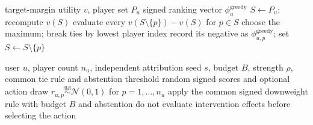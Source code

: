 \documentclass[pdflatex,sn-mathphys-num]{sn-jnl}
\theoremstyle{thmstyleone}
\theoremstyle{thmstyletwo}
\theoremstyle{thmstylethree}
\begin{document}
\begin{algorithm}[t]
\caption{Greedy sequential-deletion baseline}
\label{alg:greedy-baseline}
\begin{algorithmic}[1]
\Require target-margin utility $v$, player set $P_u$
\Ensure signed ranking vector $\phi^{\mathrm{greedy}}_u$
\State $S\gets P_u$; recompute $v(S)$
  \State evaluate every $v(S\setminus\{p\})-v(S)$ for $p\in S$
  \State choose the maximum; break ties by lowest player index
  \State record its negative as $\phi^{\mathrm{greedy}}_{u,p}$; set $S\gets S\setminus\{p\}$
\EndWhile
\end{algorithmic}
\end{algorithm}

\begin{algorithm}[t]
\caption{Random attribution negative control}
\label{alg:random-baseline}
\begin{algorithmic}[1]
\Require user $u$, player count $n_u$, independent attribution seed $s$, budget $B$, strength $\rho$, common tie rule and abstention threshold
\Ensure random signed scores and optional action
\State draw $r_{u,p}\overset{\mathrm{iid}}{\sim}\mathcal{N}(0,1)$ for $p=1,\ldots,n_u$
\State apply the common signed downweight rule with budget $B$ and abstention
\State do not evaluate intervention effects before selecting the action
\end{algorithmic}
\end{algorithm}
\end{document}
